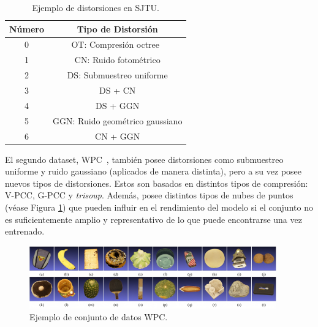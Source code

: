 \begin{table}[htp]
  \centering 
  \scriptsize
  \begin{tabular}{|c|c|}
    \hline
    \rowcolor[HTML]{FFC702}
    \textbf{Número} & \textbf{Tipo de Distorsión} \\ 
    \hline 
    0 & OT: Compresión octree~\cite{OctreeCompression} \\ 
    \hline 
    1 & CN: Ruido fotométrico\\ 
    \hline 
    2 & DS: Submuestreo uniforme \\
    \hline 
    3 & DS + CN \\
    \hline 
    4 & DS + GGN \\
    \hline 
    5 & GGN: Ruido geométrico gaussiano \\
    \hline 
    6 & CN + GGN \\ 
    \hline 
  \end{tabular}
  \caption{Ejemplo de distorsiones en SJTU.}
  \label{tab:SJTU}
\end{table}

El segundo dataset, WPC~\cite{WPC1, WPC2}, también posee distorsiones como submuestreo uniforme y 
ruido gaussiano (aplicados de manera distinta), pero a su vez posee nuevos tipos 
de distorsiones. Estos son basados en distintos tipos de compresión: V-PCC, G-PCC y \emph{trisoup}.
Además, posee distintos tipos de nubes de puntos (véase Figura \ref{fig:WPC}) que 
pueden influir en el rendimiento del modelo si el conjunto no es
suficientemente amplio y representativo de lo que puede encontrarse una vez entrenado. 

\begin{figure}[htp]
  \begin{center}
    \includegraphics[width=0.95\textwidth]{imagenes/chapter4/WPC}
  \end{center}
  \caption{Ejemplo de conjunto de datos WPC.}
  \label{fig:WPC}
\end{figure}

